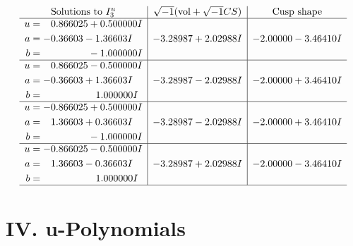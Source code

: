 \documentclass[1p]{elsarticle_modified}
\theoremstyle{definition}
\newcommand{\I}{\sqrt{-1}}
\begin{document}
$$\begin{array}{c|c|c}  
\text{Solutions to }I^u_{3}& \I (\text{vol} + \sqrt{-1}CS) & \text{Cusp shape}\\
 \hline 
\begin{aligned}
u &= \phantom{-}0.866025 + 0.500000 I \\
a &= -0.36603 - 1.36603 I \\
b &= \phantom{-0.000000 } -1.000000 I\end{aligned}
 & -3.28987 + 2.02988 I & -2.00000 - 3.46410 I \\ \hline\begin{aligned}
u &= \phantom{-}0.866025 - 0.500000 I \\
a &= -0.36603 + 1.36603 I \\
b &= \phantom{-0.000000 -}1.000000 I\end{aligned}
 & -3.28987 - 2.02988 I & -2.00000 + 3.46410 I \\ \hline\begin{aligned}
u &= -0.866025 + 0.500000 I \\
a &= \phantom{-}1.36603 + 0.36603 I \\
b &= \phantom{-0.000000 } -1.000000 I\end{aligned}
 & -3.28987 - 2.02988 I & -2.00000 + 3.46410 I \\ \hline\begin{aligned}
u &= -0.866025 - 0.500000 I \\
a &= \phantom{-}1.36603 - 0.36603 I \\
b &= \phantom{-0.000000 -}1.000000 I\end{aligned}
 & -3.28987 + 2.02988 I & -2.00000 - 3.46410 I\\
 \hline 
 \end{array}$$\newpage
\newpage\renewcommand{\arraystretch}{1}
\centering \section*{ IV. u-Polynomials}
\end{document}

